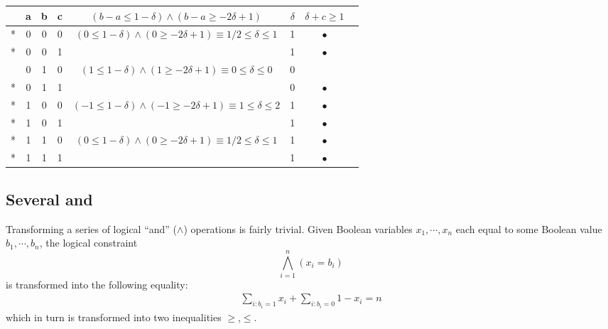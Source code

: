 \begin{table}[H]
\centering
	\begin{tabular}{cccccccc}
	  & a & b & c & $(b - a \le 1 - \delta) \wedge (b - a \ge -2\delta + 1)$                     & $\delta$ & $\delta + c \ge 1$ \\
	\midrule
	* & 0 & 0 & 0 & $(0 \le 1 - \delta) \wedge (0 \ge -2\delta + 1) \equiv 1/2 \le \delta \le 1$ &        1 & $\bullet$ \\
	* & 0 & 0 & 1 &                                                                              &        1 & $\bullet$ \\
	  & 0 & 1 & 0 & $(1 \le 1 - \delta) \wedge (1 \ge -2\delta + 1) \equiv   0 \le \delta \le 0$ &        0 &           \\
	* & 0 & 1 & 1 &                                                                              &        0 & $\bullet$ \\
	* & 1 & 0 & 0 & $(-1 \le 1 - \delta) \wedge (-1 \ge -2\delta + 1) \equiv 1 \le \delta \le 2$ &        1 & $\bullet$ \\
	* & 1 & 0 & 1 &                                                                              &        1 & $\bullet$ \\
	* & 1 & 1 & 0 & $(0 \le 1 - \delta) \wedge (0 \ge -2\delta + 1) \equiv 1/2 \le \delta \le 1$ &        1 & $\bullet$ \\
	* & 1 & 1 & 1 &                                                                              &        1 & $\bullet$ \\
	\end{tabular}
\label{table:B:3-linear-expressions}
\end{table}

\subsection{Several and}
\label{sec:conv-non-linear:several-ands}

Transforming a series of logical ``and'' ($\wedge$) operations is fairly trivial.
Given Boolean variables $x_1,\cdots,x_n$ each equal to some Boolean value $b_1,\cdots,b_n$,
the logical constraint
\begin{equation}
\label{eq:B:several-ands}
\bigwedge_{i=1}^{n} (x_i = b_i)
\end{equation}
is transformed into the following equality:
\begin{eqnarray}
\label{eq:B:several-ands:linear}
\sum_{i : b_i=1} x_i + \sum_{i : b_i=0} 1 - x_i = n
\end{eqnarray}
which in turn is transformed into two inequalities $\ge$,$\le$.

